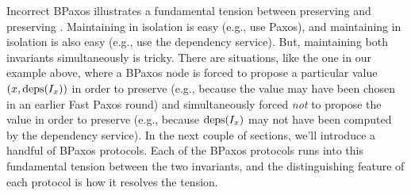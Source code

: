 
Incorrect BPaxos illustrates a fundamental tension between preserving
 and preserving .
Maintaining  in isolation is easy (e.g., use Paxos),
and maintaining  in isolation is also easy (e.g., use
the dependency service). But, maintaining both invariants simultaneously is
tricky. There are situations, like the one in our example above, where a BPaxos
node is forced to propose a particular value $(x, \text{deps}(I_x))$ in order to
preserve  (e.g., because the value may have been
chosen in an earlier Fast Paxos round) and simultaneously forced \emph{not} to
propose the value in order to preserve  (e.g.,
because $\text{deps}(I_x)$ may not have been computed by the dependency service).
%
In the next couple of sections, we'll introduce a handful of BPaxos protocols.
Each of the BPaxos protocols runs into this fundamental tension between the two
invariants, and the distinguishing feature of each protocol is how it resolves
the tension.
